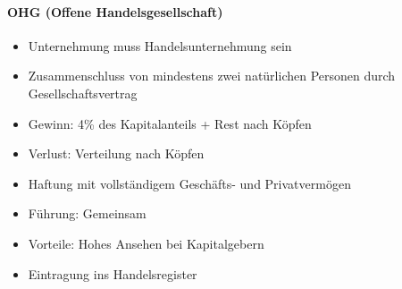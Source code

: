\documentclass[titlepage,parskip=half]{scrartcl}
\begin{document}
\paragraph{OHG (Offene Handelsgesellschaft)}
\begin{itemize}
    \item Unternehmung muss Handelsunternehmung sein
    \item Zusammenschluss von mindestens zwei natürlichen Personen durch Gesellschaftsvertrag
    \item Gewinn: 4\% des Kapitalanteils + Rest nach Köpfen
    \item Verlust: Verteilung nach Köpfen
    \item Haftung mit vollständigem Geschäfts- und Privatvermögen
    \item Führung: Gemeinsam
    \item Vorteile: Hohes Ansehen bei Kapitalgebern
    \item Eintragung ins Handelsregister
\end{itemize}
\end{document}
